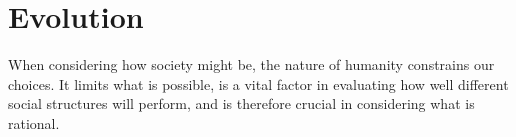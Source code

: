 \chapter{Evolution}\label{Evolution}

When considering how society might be, the nature of humanity constrains our choices.
It limits what is possible, is a vital factor in evaluating how well different social structures will perform, and is therefore crucial in considering what is rational.
